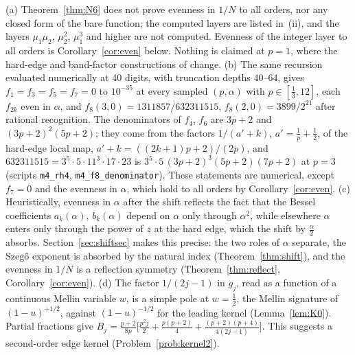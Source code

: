 \begin{remark}\label{rem:N6}
(a) Theorem~\ref{thm:N6} does not prove evenness in $1/N$ to all orders, nor any closed form of the bare function; the
computed layers are listed in~(ii), and the layers $\mu_1\mu_2$, $\mu_2^2$, $\mu_1^3$ and higher are not computed. Evenness of the
integer layer to all orders is Corollary~\ref{cor:even} below. Nothing
is claimed at $p=1$, where the hard-edge and band-factor constructions of \cite{PaperII} change.
(b) The same recursion evaluated numerically at $40$ digits, with truncation depths $40$--$64$, gives $f_1=f_3=f_5=f_7=0$ to
$10^{-35}$ at every sampled $(p,\alpha)$ with $p\in[\frac13,12]$, each $f_{2k}$ even in $\alpha$, and
$f_8(3,0)=1311857/632311515$, $f_8(2,0)=3899/2^{21}$ after rational recognition. The denominators of $f_4$, $f_6$ are
$3p+2$ and $(3p+2)^2(5p+2)$; they come from the factors $1/(a'+k)$, $a'=\frac1p+\frac12$, of the hard-edge local map,
$a'+k=((2k+1)p+2)/(2p)$, and $632311515=3^5\cdot5\cdot11^3\cdot17\cdot23$ is $3^5\cdot5\,(3p+2)^3(5p+2)(7p+2)$ at $p=3$
(scripts \texttt{m4\_rh4}, \texttt{m4\_f8\_denominator}). These statements are numerical, except $f_7=0$ and the evenness in
$\alpha$, which hold to all orders by Corollary~\ref{cor:even}.
(c) Heuristically, evenness in $\alpha$ after the shift reflects the fact that the Bessel coefficients $a_k(\alpha)$,
$b_k(\alpha)$ depend on $\alpha$ only through $\alpha^2$, while elsewhere $\alpha$ enters only through the power of $z$ at the
hard edge, which the shift by $\frac\alpha2$ absorbs. Section~\ref{sec:shiftsec} makes this precise: the two roles of $\alpha$
separate, the Szeg\H{o} exponent is absorbed by the natural index (Theorem~\ref{thm:shift}), and the evenness in $1/N$ is a
reflection symmetry (Theorem~\ref{thm:reflect}, Corollary~\ref{cor:even}).
(d) The factor $1/(2j-1)$ in $g_j$, read as a function of a continuous Mellin variable $w$, is a simple pole at
$w=\frac12$, the Mellin signature of $(1-u)^{+1/2}$, against $(1-u)^{-1/2}$ for the leading kernel
(Lemma~\ref{lem:K0}). Partial fractions give
$B_j=\frac{p+2}{8p}\bigl[\frac{p^2j}2+\frac{p(p+2)}4+\frac{(p+2)(p+4)}{4(2j-1)}\bigr]$. This suggests a second-order edge kernel
(Problem~\ref{prob:kernel2}).
\end{remark}
